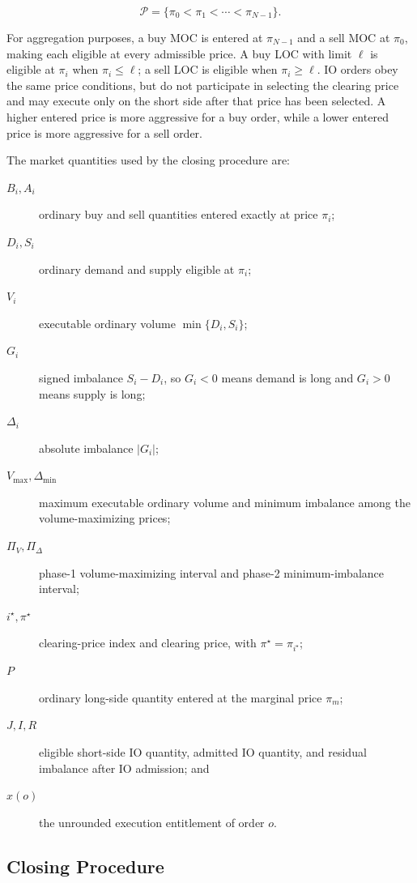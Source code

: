 \[
    \mathcal{P}=\{\pi_0<\pi_1<\cdots<\pi_{N-1}\}.
\]

For aggregation purposes, a buy MOC is entered at $\pi_{N-1}$ and a sell MOC
at $\pi_0$, making each eligible at every admissible price. A buy LOC with
limit $\ell$ is eligible at $\pi_i$ when $\pi_i\leq\ell$; a sell LOC is
eligible when $\pi_i\geq\ell$. IO orders obey the same price conditions, but
do not participate in selecting the clearing price and may execute only on the
short side after that price has been selected. A higher entered price is more
aggressive for a buy order, while a lower entered price is more aggressive for
a sell order.

The market quantities used by the closing procedure are:

\begin{description}
    \item[$B_i,A_i$] ordinary buy and sell quantities entered exactly at
        price $\pi_i$;
    \item[$D_i,S_i$] ordinary demand and supply eligible at $\pi_i$;
    \item[$V_i$] executable ordinary volume $\min\{D_i,S_i\}$;
    \item[$G_i$] signed imbalance $S_i-D_i$, so $G_i<0$ means demand is long
        and $G_i>0$ means supply is long;
    \item[$\Delta_i$] absolute imbalance $|G_i|$;
    \item[$V_{\max},\Delta_{\min}$] maximum executable ordinary volume and
        minimum imbalance among the volume-maximizing prices;
    \item[$\Pi_V,\Pi_\Delta$] phase-1 volume-maximizing interval and phase-2
        minimum-imbalance interval;
    \item[$i^\star,\pi^\star$] clearing-price index and clearing price, with
        $\pi^\star=\pi_{i^\star}$;
    \item[$P$] ordinary long-side quantity entered at the marginal price
        $\pi_m$;
    \item[$J,I,R$] eligible short-side IO quantity, admitted IO quantity, and
        residual imbalance after IO admission; and
    \item[$x(o)$] the unrounded execution entitlement of order $o$.
\end{description}

\subsection{Closing Procedure}
\label{sec:close-procedure}

